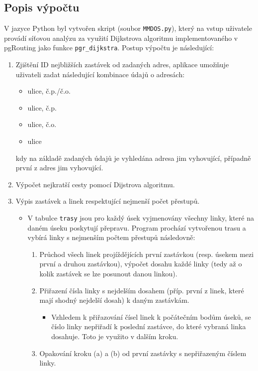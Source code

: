 \documentclass[a4paper, 12pt]{article}
\begin{document}
\subsection{Popis výpočtu}
V jazyce Python byl vytvořen skript (soubor \texttt{MMDOS.py}), který na vstup uživatele provádí síťovou analýzu za využití Dijkstrova algoritmu implementovaného v pgRouting jako funkce \texttt{pgr\_dijkstra}. Postup výpočtu je následující:
\begin{enumerate}
\item Zjištění ID nejbližších zastávek od zadaných adres, aplikace umožňuje uživateli zadat následující kombinace údajů o adresách:
	\begin{itemize}
		\item ulice, č.p./č.o.
		\item ulice, č.p.
		\item ulice, č.o.
		\item ulice
	\end{itemize}
	kdy na základě zadaných údajů je vyhledána adresa jim vyhovující, případně první z adres jim vyhovující.
\item Výpočet nejkratší cesty pomocí Dijstrova algoritmu.
\item Výpis zastávek a linek respektující nejmenší počet přestupů.
	\begin{itemize}
		\item V tabulce \texttt{trasy} jsou pro každý úsek vyjmenovány všechny linky, které na daném úseku poskytují přepravu. Program prochází vytvořenou trasu a vybírá linky s nejmenším počtem přestupů následovně:
			\begin{enumerate}
				\item Průchod všech linek projíždějících první zastávkou (resp. úsekem mezi první a druhou zastávkou), výpočet dosahu každé linky (tedy až o kolik zastávek se lze posunout danou linkou).
				\item Přiřazení čísla linky s nejdelším dosahem (příp. první z linek, které mají shodný nejdelší dosah) k daným zastávkám.
						\begin{itemize}
							\item Vzhledem k přiřazování čísel linek k počátečním bodům  úseků, se číslo linky nepřiřadí k poslední zastávce, do které vybraná linka dosahuje. Toto je využito v dalším kroku.
						\end{itemize}
				\item Opakování kroku (a) a (b) od první zastávky s nepřiřazeným číslem linky.
			\end{enumerate}
	\end{itemize}
\end{enumerate} 
\end{document}
